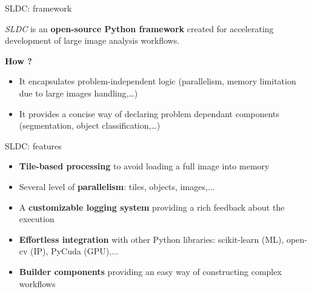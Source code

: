 \documentclass{beamer}
\begin{document}
\begin{frame}{SLDC: framework}

	\textit{SLDC} is an \textbf{open-source Python framework} created for accelerating development of large image analysis workflows. 
	
	\vfill

	\textbf{How ?}
	\begin{itemize}

		\item It encapsulates problem-independent logic (parallelism, memory limitation due to large images handling,…)

		\item It provides a concise way of declaring problem dependant components (segmentation, object classification,…)

	\end{itemize}

\end{frame}

\begin{frame}{SLDC: features}
	\begin{itemize}
	
		\item \textbf{Tile-based processing} to avoid loading a full image into memory
		
		\item Several level of \textbf{parallelism}: tiles, objects, images,...
		
		\item A \textbf{customizable logging system} providing a rich feedback about the execution
		
		\item \textbf{Effortless integration} with other Python libraries: scikit-learn (ML), open-cv (IP), PyCuda (GPU),...
		
		\item \textbf{Builder components} providing an easy way of constructing complex workflows
		
	\end{itemize}
\end{frame}
\end{document}
